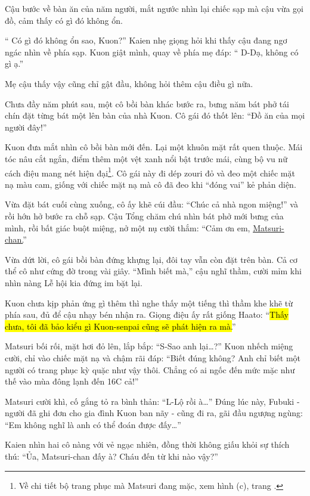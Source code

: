 \documentclass[../main.tex]{subfiles}
\begin{document}
Cậu bước về bàn ăn của năm người, mắt ngước nhìn lại chiếc sạp mà cậu vừa gọi đồ, cảm thấy có gì đó không ổn.

``{\color{red} Có gì đó không ổn sao, Kuon?}'' Kaien nhẹ giọng hỏi khi thấy cậu đang ngơ ngác nhìn về phía sạp. Kuon giật mình, quay về phía mẹ đáp: ``{\color{red} D-Dạ, không có gì ạ.}''

Mẹ cậu thấy vậy cũng chỉ gật đầu, không hỏi thêm cậu điều gì nữa.

\ct

Chưa đầy năm phút sau, một cô bồi bàn khác bước ra, bưng năm bát phở tái chín đặt từng bát một lên bàn của nhà Kuon. Cô gái đó thốt lên: ``{\color{red}Đồ ăn của mọi người đây!}''

Kuon đưa mắt nhìn cô bồi bàn mới đến. Lại một khuôn mặt rất quen thuộc. Mái tóc nâu cắt ngắn, điểm thêm một vệt xanh nổi bật trước mái, cùng bộ vu nữ cách điệu mang nét hiện đại\footnote{Về chi tiết bộ trang phục mà Matsuri đang mặc, xem hình (c), trang \pageref{setthree}.}. Cô gái này đi dép zouri đỏ và đeo một chiếc mặt nạ màu cam, giống với chiếc mặt nạ mà cô đã đeo khi ``đóng vai'' kẻ phản diện.

Vừa đặt bát cuối cùng xuống, cô ấy khẽ cúi đầu: ``{\color{red}Chúc cả nhà ngon miệng!}'' và rồi hớn hở bước ra chỗ sạp. Cậu Tổng chăm chú nhìn bát phở mới bưng của mình, rồi bất giác buột miệng, nở một nụ cười thắm: ``Cảm ơn em, \uline {Matsuri-chan.}''

Vừa dứt lời, cô gái bồi bàn đứng khựng lại, đôi tay vẫn còn đặt trên bàn. Cả cơ thể cô như cứng đờ trong vài giây. ``Mình biết mà,'' cậu nghĩ thầm, cười mỉm khi nhìn nàng Lễ hội kia đứng im bặt lại.

Kuon chưa kịp phản ứng gì thêm thì nghe thấy một tiếng thì thầm khe khẽ từ phía sau, đủ để cậu nhạy bén nhận ra. Giọng điệu ấy rất giống Haato: ``\hl{Thấy chưa, tôi đã bảo kiểu gì Kuon-senpai cũng sẽ phát hiện ra mà.}''

Matsuri bối rối, mặt hơi đỏ lên, lắp bắp: ``S-Sao anh lại\dots?'' Kuon nhếch miệng cười, chỉ vào chiếc mặt nạ và chậm rãi đáp: ``Biết đúng không? Anh chỉ biết một người có trang phục kỳ quặc như vậy thôi. Chẳng có ai ngốc đến mức mặc như thế vào mùa đông lạnh đến 16\degree C cả!''

Matsuri cười khì, cố gắng tỏ ra bình thản: ``L-Lộ rồi à\dots'' Đúng lúc này, Fubuki - người đã ghi đơn cho gia đình Kuon ban nãy - cũng đi ra, gãi đầu ngượng ngùng: ``Em không nghĩ là anh có thể đoán được đấy\dots''

Kaien nhìn hai cô nàng với vẻ ngạc nhiên, đồng thời không giấu khỏi sự thích thú: ``Ủa, Matsuri-chan đấy à? Cháu đến từ khi nào vậy?''
\end{document}
